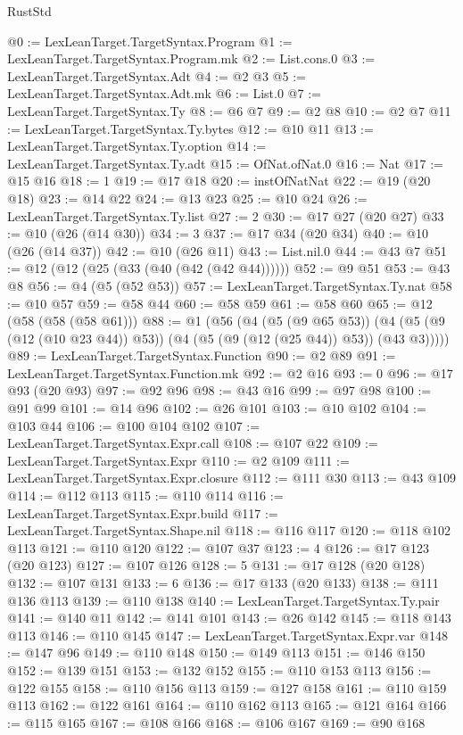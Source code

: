 \begin{lexlean}{RustStd}
\begin{coremodule}
@0 := LexLeanTarget.TargetSyntax.Program
@1 := LexLeanTarget.TargetSyntax.Program.mk
@2 := List.cons.{0}
@3 := LexLeanTarget.TargetSyntax.Adt
@4 := @2 @3
@5 := LexLeanTarget.TargetSyntax.Adt.mk
@6 := List.{0}
@7 := LexLeanTarget.TargetSyntax.Ty
@8 := @6 @7
@9 := @2 @8
@10 := @2 @7
@11 := LexLeanTarget.TargetSyntax.Ty.bytes
@12 := @10 @11
@13 := LexLeanTarget.TargetSyntax.Ty.option
@14 := LexLeanTarget.TargetSyntax.Ty.adt
@15 := OfNat.ofNat.{0}
@16 := Nat
@17 := @15 @16
@18 := 1
@19 := @17 @18
@20 := instOfNatNat
@22 := @19 (@20 @18)
@23 := @14 @22
@24 := @13 @23
@25 := @10 @24
@26 := LexLeanTarget.TargetSyntax.Ty.list
@27 := 2
@30 := @17 @27 (@20 @27)
@33 := @10 (@26 (@14 @30))
@34 := 3
@37 := @17 @34 (@20 @34)
@40 := @10 (@26 (@14 @37))
@42 := @10 (@26 @11)
@43 := List.nil.{0}
@44 := @43 @7
@51 := @12 (@12 (@25 (@33 (@40 (@42 (@42 @44))))))
@52 := @9 @51
@53 := @43 @8
@56 := @4 (@5 (@52 @53))
@57 := LexLeanTarget.TargetSyntax.Ty.nat
@58 := @10 @57
@59 := @58 @44
@60 := @58 @59
@61 := @58 @60
@65 := @12 (@58 (@58 (@58 @61)))
@88 := @1
    (@56
      (@4
        (@5 (@9 @65 @53))
        (@4 (@5 (@9 (@12 (@10 @23 @44)) @53)) (@4 (@5 (@9 (@12 (@25 @44)) @53)) (@43 @3)))))
@89 := LexLeanTarget.TargetSyntax.Function
@90 := @2 @89
@91 := LexLeanTarget.TargetSyntax.Function.mk
@92 := @2 @16
@93 := 0
@96 := @17 @93 (@20 @93)
@97 := @92 @96
@98 := @43 @16
@99 := @97 @98
@100 := @91 @99
@101 := @14 @96
@102 := @26 @101
@103 := @10 @102
@104 := @103 @44
@106 := @100 @104 @102
@107 := LexLeanTarget.TargetSyntax.Expr.call
@108 := @107 @22
@109 := LexLeanTarget.TargetSyntax.Expr
@110 := @2 @109
@111 := LexLeanTarget.TargetSyntax.Expr.closure
@112 := @111 @30
@113 := @43 @109
@114 := @112 @113
@115 := @110 @114
@116 := LexLeanTarget.TargetSyntax.Expr.build
@117 := LexLeanTarget.TargetSyntax.Shape.nil
@118 := @116 @117
@120 := @118 @102 @113
@121 := @110 @120
@122 := @107 @37
@123 := 4
@126 := @17 @123 (@20 @123)
@127 := @107 @126
@128 := 5
@131 := @17 @128 (@20 @128)
@132 := @107 @131
@133 := 6
@136 := @17 @133 (@20 @133)
@138 := @111 @136 @113
@139 := @110 @138
@140 := LexLeanTarget.TargetSyntax.Ty.pair
@141 := @140 @11
@142 := @141 @101
@143 := @26 @142
@145 := @118 @143 @113
@146 := @110 @145
@147 := LexLeanTarget.TargetSyntax.Expr.var
@148 := @147 @96
@149 := @110 @148
@150 := @149 @113
@151 := @146 @150
@152 := @139 @151
@153 := @132 @152
@155 := @110 @153 @113
@156 := @122 @155
@158 := @110 @156 @113
@159 := @127 @158
@161 := @110 @159 @113
@162 := @122 @161
@164 := @110 @162 @113
@165 := @121 @164
@166 := @115 @165
@167 := @108 @166
@168 := @106 @167
@169 := @90 @168

\end{coremodule}
\end{lexlean}
